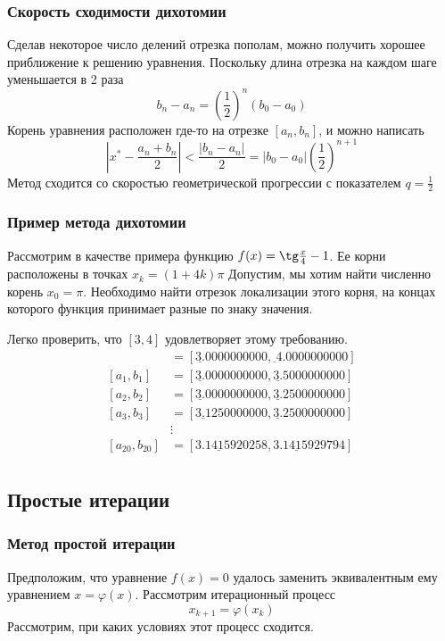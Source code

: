 \documentclass[apectratio=43,unicode]{beamer}
\begin{document}
\begin{frame}
\frametitle{Скорость сходимости дихотомии}
	Сделав некоторое число делений отрезка пополам,
	можно получить хорошее приближение к решению уравнения. Поскольку длина отрезка на каждом шаге уменьшается в 2 раза
	$$b_n - a_n = \left(\frac{1}{2}\right)^n (b_0 - a_0)$$
	Корень уравнения расположен где-то на отрезке $[a_n, b_n]$, и можно написать
	$$
	\left|x^* - \frac{a_n+b_n}{2}\right| < \frac{|b_n - a_n|}{2} = |b_0 - a_0| \left(\frac{1}{2}\right)^{n+1}
	$$
	Метод сходится со скоростью геометрической прогрессии с показателем $q = \frac{1}{2}$
\end{frame}

\begin{frame}
\frametitle{Пример метода дихотомии}
	Рассмотрим в качестве примера функцию $f(x) = \tg \frac{x}{4} - 1$. Ее корни расположены в точках $x_k = (1 + 4k) \pi$
	Допустим, мы хотим найти численно корень $x_0 = \pi$. Необходимо найти отрезок локализации этого корня, на концах которого функция 
	принимает разные по знаку значения.

	Легко проверить, что $[3,4]$ удовлетворяет этому требованию.
	\begin{align*}
		[a_{0},b_{0}] &= [\underline{3.}0000000000, \underline{}4.0000000000]\\
		[a_{1},b_{1}] &= [\underline{3.}0000000000, \underline{3.}5000000000]\\
		[a_{2},b_{2}] &= [\underline{3.}0000000000, \underline{3.}2500000000]\\
		[a_{3},b_{3}] &= [\underline{3.1}250000000, \underline{3.}2500000000]\\
		&\vdots\\
		[a_{20},b_{20}] &= [\underline{3.141592}0258, \underline{3.141592}9794]\\
	\end{align*}
\end{frame}

\subsection{Простые итерации}
\begin{frame}
\frametitle{Метод простой итерации}
	Предположим, что уравнение $f(x) = 0$ удалось заменить эквивалентным ему уравнением $x = \varphi(x)$.
	Рассмотрим итерационный процесс
	\[
	x_{k+1} = \varphi(x_k)
	\]
	Рассмотрим, при каких условиях этот процесс сходится.
\end{frame}
\end{document}
